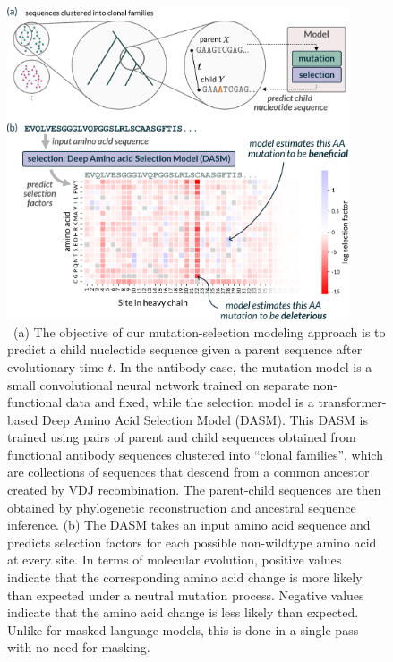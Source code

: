 \documentclass{article}
\begin{document}
\begin{figure}[h!]
\centering
\centerline{\includegraphics[width=0.9\textwidth]{figures/dasm-output-schematic}}
\caption{\
(a) The objective of our mutation-selection modeling approach is to predict a child nucleotide sequence given a parent sequence after evolutionary time $t$. 
In the antibody case, the mutation model is a small convolutional neural network trained on separate non-functional data and fixed, while the selection model is a transformer-based Deep Amino Acid Selection Model (DASM). 
This DASM is trained using pairs of parent and child sequences obtained from functional antibody sequences clustered into ``clonal families'', which are collections of sequences that descend from a common ancestor created by VDJ recombination.
The parent-child sequences are then obtained by phylogenetic reconstruction and ancestral sequence inference.
(b) The DASM takes an input amino acid sequence and predicts selection factors for each possible non-wildtype amino acid at every site. 
In terms of molecular evolution, positive values indicate that the corresponding amino acid change is more likely than expected under a neutral mutation process. 
Negative values indicate that the amino acid change is less likely than expected. 
Unlike for masked language models, this is done in a single pass with no need for masking.
}%
\label{fig:methods}
\end{figure}
\end{document}
